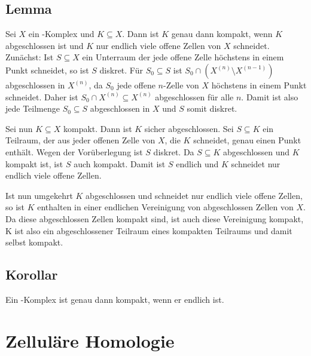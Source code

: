 \subsection[Lemma: Kompaktheit von Teilmengen eines \CW-Komplexes]{Lemma} %
\label{sub:116}
Sei $X$ ein \CW-Komplex und $K \subseteq X$. Dann ist $K$ genau dann kompakt, wenn $K$ abgeschlossen ist und $K$ nur endlich viele offene Zellen von $X$ schneidet.
Zunächst: Ist $S \subseteq X$ ein Unterraum der jede offene Zelle höchstens in einem Punkt schneidet, so ist $S$ diskret. Für $S_0 \subseteq S$ ist 
$S_0 \cap (X^{(n)} \setminus X^{(n-1)})$ abgeschlossen in $X^{(n)}$, da $S_0$ jede offene $n$-Zelle von $X$ höchstens in einem Punkt schneidet.  Daher ist 
$S_0 \cap X^{(n)} \subseteq X^{(n)}$ abgeschlossen für alle $n$. Damit ist also jede Teilmenge $S_0 \subseteq S$ abgeschlossen in $X$ und $S$ somit diskret.

Sei nun $K \subseteq X$ kompakt. Dann ist $K$ sicher abgeschlossen. Sei $S \subseteq K$ ein Teilraum, der aus jeder offenen Zelle von $X$, die $K$ schneidet, genau einen 
Punkt enthält. Wegen der Vorüberlegung ist $S$ diskret. Da $S \subseteq K$ abgeschlossen und $K$ kompakt ist, ist $S$ auch kompakt. Damit ist $S$ endlich und $K$
schneidet nur endlich viele offene Zellen.

Ist nun umgekehrt $K$ abgeschlossen und schneidet nur endlich viele offene Zellen, so ist $K$ enthalten in einer endlichen Vereinigung von abgeschlossen Zellen von $X$.
Da diese abgeschlossen Zellen kompakt sind, ist auch diese Vereinigung kompakt, K ist also ein abgeschlossener Teilraum eines kompakten Teilraums und damit selbst kompakt.
\bewende

\subsection[Korollar: Ein \CW-Komplex ist genau dann kompakt, wenn er endlich ist.]{Korollar} %
\label{sub:117}
Ein \CW-Komplex ist genau dann kompakt, wenn er endlich ist.
\newpage

\section{Zelluläre Homologie} %
\label{sec:12}

